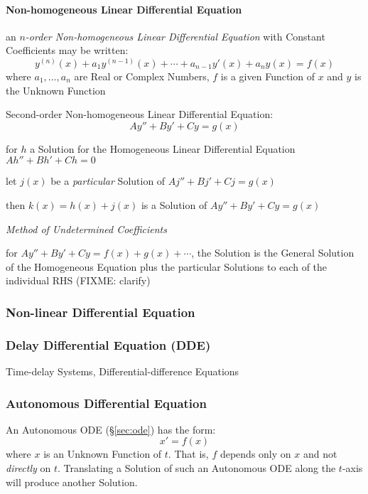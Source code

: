 \paragraph{Non-homogeneous Linear Differential Equation}
\label{sec:nonhomogeneous_linear_differential}\hfill

an \emph{$n$-order Non-homogeneous Linear Differential Equation} with Constant
Coefficients may be written:
\[
  y^{(n)}(x) + a_1y^{(n-1)}(x) + \cdots + a_{n-1}y'(x) + a_ny(x) = f(x)
\]
where $a_1,\ldots,a_n$ are Real or Complex Numbers, $f$ is a given Function of
$x$ and $y$ is the Unknown Function

Second-order Non-homogeneous Linear Differential Equation:
\[
  A y'' + B y' + C y = g(x)
\]

for $h$ a Solution for the Homogeneous Linear Differential Equation $Ah'' + Bh'
+ Ch = 0$

let $j(x)$ be a \emph{particular} Solution of $Aj'' + Bj' + Cj = g(x)$

then $k(x) = h(x) + j(x)$ is a Solution of $A y'' + B y' + C y = g(x)$

\emph{Method of Undetermined Coefficients}

for $A y'' + B y' + C y = f(x) + g(x) + \cdots$, the Solution is the General
Solution of the Homogeneous Equation plus the particular Solutions to each of
the individual RHS (FIXME: clarify)



\subsubsection{Non-linear Differential Equation}
\label{sec:nonlinear_differential_equation}

\subsubsection{Delay Differential Equation (DDE)}\label{sec:dde}

Time-delay Systems, Differential-difference Equations



\subsubsection{Autonomous Differential Equation}
\label{sec:autonomous_differential_equation}

An Autonomous ODE (\S\ref{sec:ode}) has the form:
\[
  x' = f(x)
\]
where $x$ is an Unknown Function of $t$. That is, $f$ depends only on $x$ and
not \emph{directly} on $t$. Translating a Solution of such an Autonomous ODE
along the $t$-axis will produce another Solution.

